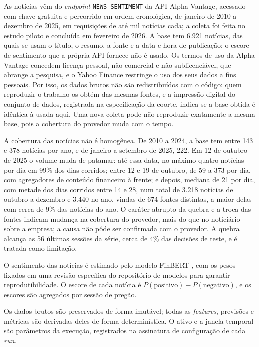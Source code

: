 As notícias vêm do \textit{endpoint} \texttt{NEWS\_SENTIMENT} da API Alpha Vantage, acessado com chave gratuita e percorrido em ordem cronológica, de janeiro de 2010 a dezembro de 2025, em requisições de até mil notícias cada; a coleta foi feita no estudo piloto e concluída em fevereiro de 2026. A base tem 6.921 notícias, das quais se usam o título, o resumo, a fonte e a data e hora de publicação; o escore de sentimento que a própria API fornece não é usado. Os termos de uso da Alpha Vantage concedem licença pessoal, não comercial e não sublicenciável, que abrange a pesquisa, e o Yahoo Finance restringe o uso dos seus dados a fins pessoais. Por isso, os dados brutos não são redistribuídos com o código: quem reproduzir o trabalho os obtém das mesmas fontes, e a impressão digital do conjunto de dados, registrada na especificação da coorte, indica se a base obtida é idêntica à usada aqui. Uma nova coleta pode não reproduzir exatamente a mesma base, pois a cobertura do provedor muda com o tempo.

A cobertura das notícias não é homogênea. De 2010 a 2024, a base tem entre 143 e 378 notícias por ano, e de janeiro a setembro de 2025, 222. Em 12 de outubro de 2025 o volume muda de patamar: até essa data, no máximo quatro notícias por dia em 99\% dos dias corridos; entre 12 e 19 de outubro, de 59 a 373 por dia, com agregadores de conteúdo financeiro à frente; e depois, mediana de 21 por dia, com metade dos dias corridos entre 14 e 28, num total de 3.218 notícias de outubro a dezembro e 3.440 no ano, vindas de 674 fontes distintas, a maior delas com cerca de 9\% das notícias do ano. O caráter abrupto da quebra e a troca das fontes indicam mudança na cobertura do provedor, mais do que no noticiário sobre a empresa; a causa não pôde ser confirmada com o provedor. A quebra alcança as 56 últimas sessões da série, cerca de 4\% das decisões de teste, e é tratada como limitação.

O sentimento das notícias é estimado pelo modelo FinBERT \cite{ARACI2019}, com os pesos fixados em uma revisão específica do repositório de modelos para garantir reprodutibilidade. O escore de cada notícia é \(P(\text{positivo}) - P(\text{negativo})\), e os escores são agregados por sessão de pregão.

Os dados brutos são preservados de forma imutável; todas as \textit{features}, previsões e métricas são derivadas deles de forma determinística. O ativo e a janela temporal são parâmetros da execução, registrados na assinatura de configuração de cada \textit{run}.

